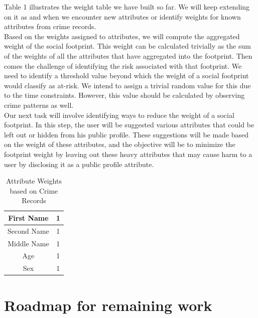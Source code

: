 \documentclass[conference]{IEEEtran}
\begin{document}
Table 1 illustrates the weight table we have built so far. We will keep extending on it as and when we encounter new attributes or identify weights for known attributes from crime records.\\

Based on the weights assigned to attributes, we will compute the aggregated weight of the social footprint. This weight can be calculated trivially as the sum of the weights of all the attributes that have aggregated into the footprint. Then comes the challenge of identifying the risk associated with that footprint. We need to identify a threshold value beyond which the weight of a social footprint would classify as at-risk. We intend to assign a trivial random value for this due to the time constraints. However, this value should be calculated by observing crime patterns as well.\\

Our next task will involve identifying ways to reduce the weight of a social footprint. In this step, the user will be suggested various attributes that could be left out or hidden from his public profile. These suggestions will be made based on the weight of these attributes, and the objective will be to minimize the footprint weight by leaving out these heavy attributes that may cause harm to a user by disclosing it as a public profile attribute.


\begin{table}[!t]
\renewcommand{\arraystretch}{3.0}
\caption{Attribute Weights based on Crime Records}
\label{attribute_table}
\centering
\begin{tabular}{|c||c|}
\hline
\large{First Name} & \large{1}\\
\hline
\large{Second Name} & \large{1}\\
\hline
\large{Middle Name} & \large{1}\\
\hline
\large{Age} & \large{1}\\
\hline
\large{Sex} & \large{1}\\
\hline

\end{tabular}
\end{table}

\section{Roadmap for remaining work}
\end{document}
